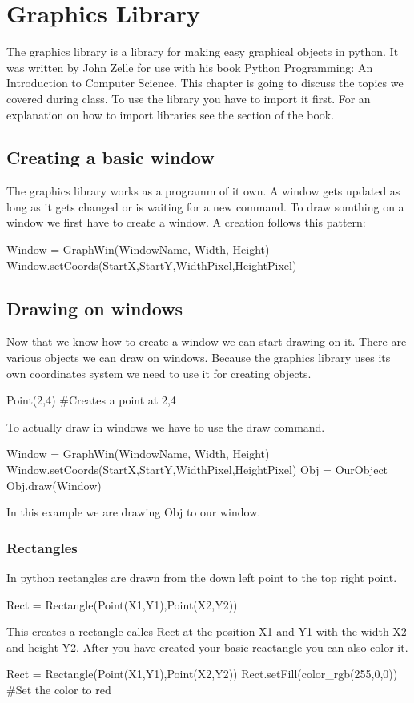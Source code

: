 \chapter{Graphics Library}

The graphics library is a library for making easy graphical objects in python. It was written by John Zelle for use with his book Python Programming: An
Introduction to Computer Science. This chapter is going to discuss the topics we covered during class. To use the library you have to import it first. For an explanation on how to import libraries see the section of the book.

\section{Creating a basic window}
The graphics library works as a programm of it own. A window gets updated as long as it gets changed or is waiting for a new command.
To draw somthing on a window we first have to create a window. A creation follows this pattern:
\begin{fullwidth}
\begin{python}
Window = GraphWin(WindowName, Width, Height)
Window.setCoords(StartX,StartY,WidthPixel,HeightPixel)
\end{python}
\end{fullwidth}

\section{Drawing on windows}
Now that we know how to create a window we can start drawing on it. There are various objects we can draw on windows. Because the graphics library uses its own coordinates system we need to use it for creating objects.
\begin{python}
Point(2,4) #Creates a point at 2,4
\end{python}
To actually draw in windows we have to use the draw command. 
\begin{python}
Window = GraphWin(WindowName, Width, Height)
Window.setCoords(StartX,StartY,WidthPixel,HeightPixel)
Obj = OurObject
Obj.draw(Window)
\end{python}
In this example we are drawing Obj to our window.
\subsection{Rectangles}
In python rectangles are drawn from the down left point to the top right point.
\begin{python}
Rect = Rectangle(Point(X1,Y1),Point(X2,Y2))
\end{python}
This creates a rectangle calles Rect at the position X1 and Y1 with the width X2 and height Y2. 
After you have created your basic reactangle you can also color it.
\begin{python}
Rect = Rectangle(Point(X1,Y1),Point(X2,Y2))
Rect.setFill(color_rgb(255,0,0)) #Set the color to red
\end{python}